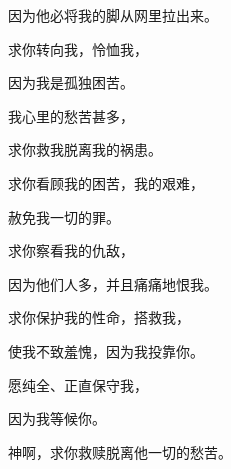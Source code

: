 {\par }{\Q 因为他必将我的脚从网里拉出来。
\par }{\BB \par }{\Q {}求你转向我，怜恤我，
\par }{\Q 因为我是孤独困苦。
\par }{\Q {}我心里的愁苦甚多，
\par }{\Q 求你救我脱离我的祸患。
\par }{\Q {}求你看顾我的困苦，我的艰难，
\par }{\Q 赦免我一切的罪。
\par }{\BB \par }{\Q {}求你察看我的仇敌，
\par }{\Q 因为他们人多，并且痛痛地恨我。
\par }{\Q {}求你保护我的性命，搭救我，
\par }{\Q 使我不致羞愧，因为我投靠你。
\par }{\Q {}愿纯全、正直保守我，
\par }{\Q 因为我等候你。
\par }{\BB \par }{\Q {}神啊，求你救赎{}脱离他一切的愁苦。

}
